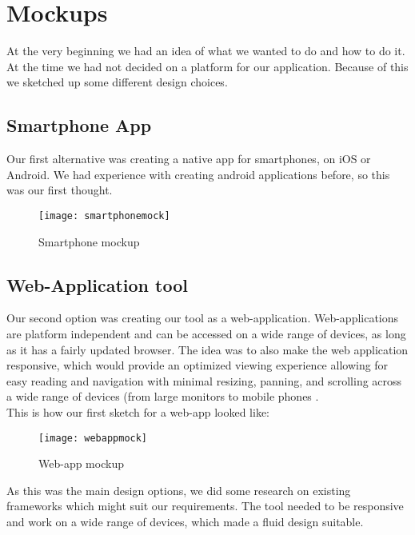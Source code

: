 \section{Mockups}
At the very beginning we had an idea of what we wanted to do and how to do it. At the time we had not decided on a platform for our application. Because of this we sketched up some different design choices.

\subsection{Smartphone App}
Our first alternative was creating a native app for smartphones, on iOS or Android. We had experience with creating android applications before, so this was our first thought. 
\begin{figure}[h!]
\centering
	\texttt{[image: smartphonemock]}
\caption{Smartphone mockup}
\label{smartphonemock}
\end{figure}

\subsection{Web-Application tool}
Our second option was creating our tool as a web-application. Web-applications are platform independent and can be accessed on a wide range of devices, as long as it has a fairly updated browser. The idea was to also make the web application responsive, which would provide an optimized viewing experience allowing for easy reading and navigation with minimal resizing, panning, and scrolling across a wide range of devices (from large monitors to mobile phones .\\
This is how our first sketch for a web-app looked like: 
\begin{figure}[h!]
\centering 
	\texttt{[image: webappmock]}
\caption{Web-app mockup}
\label{webappmock}
\end{figure}
As this was the main design options, we did some research on existing frameworks which might suit our requirements. The tool needed to be responsive and work on a wide range of devices, which made a fluid design suitable.

